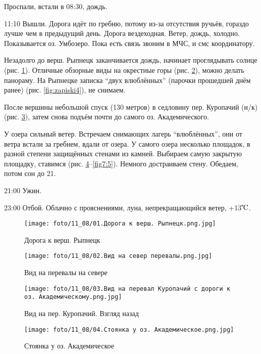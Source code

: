 Проспали, встали в 08:30, дождь.

11:10 Вышли.
Дорога идёт по гребню, потому из-за отсутствия ручьёв, гораздо лучше чем в предыдущий день.
Дорога вездеходная. Ветер, дождь, холодно. Показывается оз. Умбозеро. Пока есть связь звоним в МЧС, и смс координатору.

Незадолго до верш. Рыпнецк заканчивается дождь, начинает проглядывать солнце (рис. \ref{fig7:1}).
Отличные обзорные виды на окрестные горы (рис. \ref{fig7:2}),
можно делать панораму. На Рыпнецке записка \enquote{двух влюблённых} (парочки прошедшей днём ранее) (рис. \ref{fig:zapiski4}),
не снимаем.

После вершины небольшой спуск (130 метров) в седловину пер. Куропачий (н/к) (рис. \ref{fig7:3}), затем снова подъём почти
до самого оз. Академического.

У озера сильный ветер. Встречаем снимающих лагерь \enquote{влюблённых}, они от ветра  встали за гребнем, вдали от озера.
У самого озера несколько площадок, в разной степени защищённых стенами из камней.
Выбираем самую закрытую площадку, ставимся (рис. \ref{fig7:4}--\ref{fig7:5}). Немного достраиваем стену. Обедаем, потом сон до 21.

21:00 Ужин.

23:00 Отбой. Облачно с прояснениями, луна, непрекращающийся ветер, +13$\tccentigrade$.

\begin{figure}
    \centering
    \texttt{[image: foto/11\_08/01.Дорога к верш. Рыпнецк.png.jpg]}
    \caption{Дорога к верш. Рыпнецк}
    \label{fig7:1}
\end{figure}

\begin{figure}
    \centering
    \texttt{[image: foto/11\_08/02.Вид на север перевалы.png.jpg]}
    \caption{Вид на перевалы на севере}
    \label{fig7:2}
\end{figure}

\begin{figure}
    \centering
    \texttt{[image: foto/11\_08/03.Вид на перевал Куропачий с дороги к оз. Академическому.png.jpg]}
    \caption{Вид на пер. Куропачий. Взгляд назад}
    \label{fig7:3}
\end{figure}

\begin{figure}
    \centering
    \texttt{[image: foto/11\_08/04.Стоянка у оз. Академическое.png.jpg]}
    \caption{Стоянка у оз. Академическое}
    \label{fig7:4}
\end{figure}

